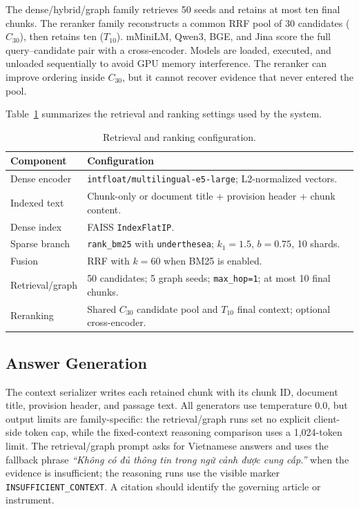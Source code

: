 The dense/hybrid/graph family retrieves 50 seeds and retains at most ten final
chunks. The reranker family reconstructs a common RRF pool of 30 candidates
($C_{30}$), then retains ten ($T_{10}$). mMiniLM, Qwen3, BGE, and Jina score
the full query--candidate pair with a cross-encoder. Models are loaded,
executed, and unloaded sequentially to avoid GPU memory interference. The
reranker can improve ordering inside $C_{30}$, but it cannot recover evidence
that never entered the pool.

Table~\ref{tab:retrieval-ranking-config} summarizes the retrieval and ranking
settings used by the system.

\begin{table}[t]
\centering
\scriptsize
\caption{Retrieval and ranking configuration.}
\label{tab:retrieval-ranking-config}
\begin{tabularx}{\columnwidth}{@{}p{}X@{}}
\toprule
\textbf{Component} & \textbf{Configuration} \\
\midrule
Dense encoder & \texttt{intfloat/multilingual-e5-large}; L2-normalized vectors. \\
Indexed text & Chunk-only or document title + provision header + chunk content. \\
Dense index & FAISS \texttt{IndexFlatIP}. \\
Sparse branch & \texttt{rank\_bm25} with \texttt{underthesea}; $k_1=1.5$, $b=0.75$, 10 shards. \\
Fusion & RRF with $k=60$ when BM25 is enabled. \\
Retrieval/graph & 50 candidates; 5 graph seeds; \texttt{max\_hop=1}; at most 10 final chunks. \\
Reranking & Shared $C_{30}$ candidate pool and $T_{10}$ final context; optional cross-encoder. \\
\bottomrule
\end{tabularx}
\end{table}

\subsection{Answer Generation}
\label{sec:answer-generation}

The context serializer writes each retained chunk with its chunk ID, document
title, provision header, and passage text. All generators use temperature
$0.0$, but output limits are family-specific: the retrieval/graph runs set no
explicit client-side token cap, while the fixed-context reasoning comparison
uses a 1,024-token limit. The retrieval/graph prompt asks for Vietnamese
answers and uses the fallback phrase
\textit{``Không có đủ thông tin trong ngữ cảnh được cung cấp.''} when the
evidence is insufficient; the reasoning runs use the visible marker
\texttt{INSUFFICIENT\_CONTEXT}. A citation should identify the governing
article or instrument.

